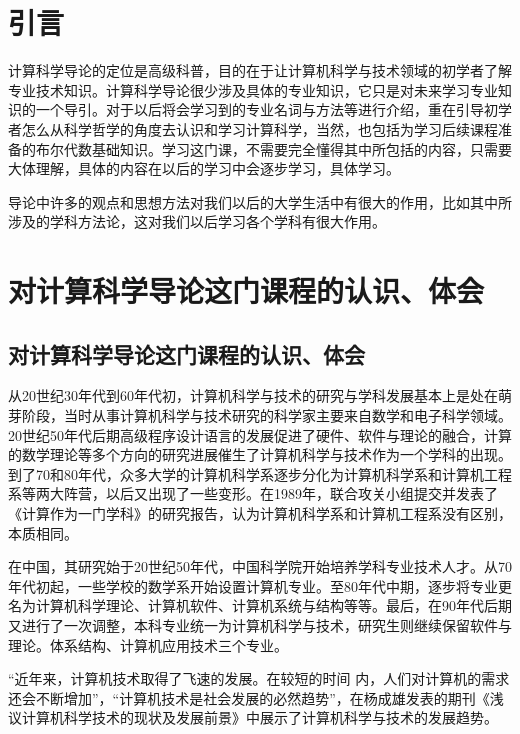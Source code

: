 \documentclass{article}
\begin{document}
\thispagestyle{empty}
\newpage
\setcounter{page}{1}
\section{引言}
计算科学导论的定位是高级科普，目的在于让计算机科学与技术领域的初学者了解专业技术知识。计算科学导论很少涉及具体的专业知识，它只是对未来学习专业知识的一个导引。对于以后将会学习到的专业名词与方法等进行介绍，重在引导初学者怎么从科学哲学的角度去认识和学习计算科学，当然，也包括为学习后续课程准备的布尔代数基础知识。学习这门课，不需要完全懂得其中所包括的内容，只需要大体理解，具体的内容在以后的学习中会逐步学习，具体学习。\par
导论中许多的观点和思想方法对我们以后的大学生活中有很大的作用，比如其中所涉及的学科方法论，这对我们以后学习各个学科有很大作用。


\section{对计算科学导论这门课程的认识、体会}
\par

\subsection{对计算科学导论这门课程的认识、体会}
从20世纪30年代到60年代初，计算机科学与技术的研究与学科发展基本上是处在萌芽阶段，当时从事计算机科学与技术研究的科学家主要来自数学和电子科学领域。20世纪50年代后期高级程序设计语言的发展促进了硬件、软件与理论的融合，计算的数学理论等多个方向的研究进展催生了计算机科学与技术作为一个学科的出现。到了70和80年代，众多大学的计算机科学系逐步分化为计算机科学系和计算机工程系等两大阵营，以后又出现了一些变形。在1989年，联合攻关小组提交并发表了《计算作为一门学科》的研究报告，认为计算机科学系和计算机工程系没有区别，本质相同。\par
在中国，其研究始于20世纪50年代，中国科学院开始培养学科专业技术人才。从70年代初起，一些学校的数学系开始设置计算机专业。至80年代中期，逐步将专业更名为计算机科学理论、计算机软件、计算机系统与结构等等。最后，在90年代后期又进行了一次调整，本科专业统一为计算机科学与技术，研究生则继续保留软件与理论。体系结构、计算机应用技术三个专业。\par
“近年来，计算机技术取得了飞速的发展。在较短的时间 内，人们对计算机的需求还会不断增加”，“计算机技术是社会发展的必然趋势”，在杨成雄发表的期刊《浅议计算机科学技术的现状及发展前景》\citep{yangchengxiong}中展示了计算机科学与技术的发展趋势。\par
\end{document}
